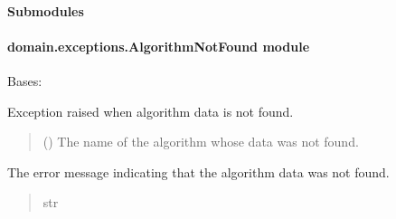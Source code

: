 \documentclass[letterpaper,10pt,english]{sphinxmanual}
\begin{document}
\paragraph{Submodules}
\label{\detokenize{domain.exceptions:submodules}}

\paragraph{domain.exceptions.AlgorithmNotFound module}
\label{\detokenize{domain.exceptions:module-domain.exceptions.AlgorithmNotFound}}\label{\detokenize{domain.exceptions:domain-exceptions-algorithmnotfound-module}}

\begin{fulllineitems}
\label{\detokenize{domain.exceptions:domain.exceptions.AlgorithmNotFound.AlgorithmDataNotFound}}
\pysigstartsignatures
{}
\pysigstopsignatures
\sphinxAtStartPar
Bases: 

\sphinxAtStartPar
Exception raised when algorithm data is not found.
\begin{quote}\begin{description}
\sphinxAtStartPar
{} () \textendash{} The name of the algorithm whose data was not found.

\end{description}\end{quote}

\begin{fulllineitems}
\label{\detokenize{domain.exceptions:domain.exceptions.AlgorithmNotFound.AlgorithmDataNotFound.message}}
\pysigstartsignatures
{}
\pysigstopsignatures
\sphinxAtStartPar
The error message indicating that the algorithm data was not found.
\begin{quote}\begin{description}
\sphinxAtStartPar
str

\end{description}\end{quote}

\end{fulllineitems}


\end{fulllineitems}
\end{document}
